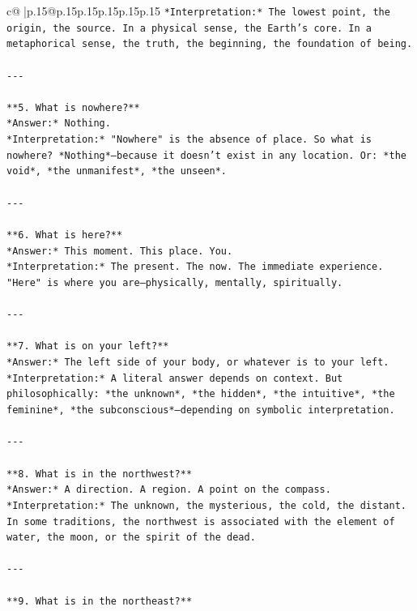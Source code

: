 \documentclass{article}
\begin{document}
{\begin{supertabular}{c@{$\;$}|p{.15\linewidth}@{}p{.15\linewidth}p{.15\linewidth}p{.15\linewidth}p{.15\linewidth}p{.15\linewidth}}
{{{\texttt{*Interpretation:* The lowest point, the origin, the source. In a physical sense, the Earth's core. In a metaphorical sense, the truth, the beginning, the foundation of being.} \\
\\ 
\texttt{{-}{-}{-}} \\
\\ 
\texttt{**5. What is nowhere?**  } \\
\texttt{*Answer:* Nothing.  } \\
\texttt{*Interpretation:* "Nowhere" is the absence of place. So what is nowhere? *Nothing*—because it doesn't exist in any location. Or: *the void*, *the unmanifest*, *the unseen*.} \\
\\ 
\texttt{{-}{-}{-}} \\
\\ 
\texttt{**6. What is here?**  } \\
\texttt{*Answer:* This moment. This place. You.  } \\
\texttt{*Interpretation:* The present. The now. The immediate experience. "Here" is where you are—physically, mentally, spiritually.} \\
\\ 
\texttt{{-}{-}{-}} \\
\\ 
\texttt{**7. What is on your left?**  } \\
\texttt{*Answer:* The left side of your body, or whatever is to your left.  } \\
\texttt{*Interpretation:* A literal answer depends on context. But philosophically: *the unknown*, *the hidden*, *the intuitive*, *the feminine*, *the subconscious*—depending on symbolic interpretation.} \\
\\ 
\texttt{{-}{-}{-}} \\
\\ 
\texttt{**8. What is in the northwest?**  } \\
\texttt{*Answer:* A direction. A region. A point on the compass.  } \\
\texttt{*Interpretation:* The unknown, the mysterious, the cold, the distant. In some traditions, the northwest is associated with the element of water, the moon, or the spirit of the dead.} \\
\\ 
\texttt{{-}{-}{-}} \\
\\ 
\texttt{**9. What is in the northeast?**  } \\
}}}
\end{supertabular}}
\end{document}
